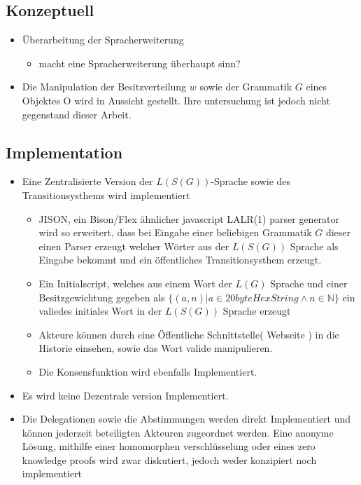 \documentclass[]{article}
\begin{document}
\subsection*{Konzeptuell}
\begin{itemize}
  \item Überarbeitung der Spracherweiterung
    \begin{itemize}
      \item macht eine Spracherweiterung überhaupt sinn?
    \end{itemize}
  \item Die Manipulation der Besitzverteilung $w$ sowie der Grammatik $G$ eines Objektes O wird in Aussicht gestellt. Ihre untersuchung ist jedoch nicht gegenstand dieser Arbeit.
\end{itemize}


\subsection*{Implementation}
\begin{itemize}
  \item Eine Zentralisierte Version der $L(S(G))$-Sprache sowie des Transitionsysthems wird implementiert 
  \begin{itemize}
    \item JISON, ein Bison/Flex ähnlicher javascript LALR(1) parser generator wird so erweitert, dass bei Eingabe einer beliebigen Grammatik $G$ dieser einen Parser erzeugt welcher Wörter aus der $L(S(G))$ Sprache als Eingabe bekommt und ein öffentliches Transitionsysthem erzeugt.
    \item Ein Initialscript, welches aus einem Wort der $L(G)$ Sprache und einer Besitzgewichtung gegeben als $\{(a,n)| a\in 20byteHexString \land n\in \mathbb{N} \}$ ein valiedes initiales Wort in der $L(S(G))$ Sprache erzeugt 
    \item Akteure können durch eine Öffentliche Schnittstelle( Webseite ) in die Historie einsehen, sowie das Wort valide manipulieren.
    \item Die Konsensfunktion wird ebenfalls Implementiert.
  \end{itemize}
  \item Es wird keine Dezentrale version Implementiert.
  \item Die Delegationen sowie die Abstimmungen werden direkt Implementiert und können jederzeit beteiligten Akteuren zugeordnet werden. Eine anonyme Lösung, mithilfe einer homomorphen verschlüsselung oder eines zero knowledge proofs wird zwar diskutiert, jedoch weder konzipiert noch implementiert
\end{itemize}
\end{document}

